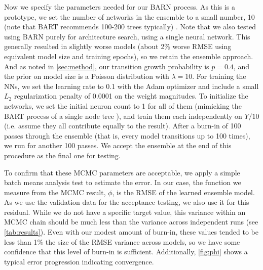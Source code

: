 \documentclass[12pt]{article}
\begin{document}
Now we specify the parameters needed for our BARN process.  As this is a prototype, we set the number of networks in the ensemble to a small number, 10 (note that BART recommends 100-200 trees typically) \cite{chipman2010bart}.  Note that we also tested using BARN purely for architecture search, using a single neural network.  This generally resulted in slightly worse models (about 2\% worse RMSE using equivalent model size and training epochs), so we retain the ensemble approach.  And as noted in \autoref{sec:method}, our transition growth probability is $p=0.4$, and the prior on model size is a Poisson distribution with $\lambda=10$.  For training the NNs, we set the learning rate to 0.1 with the Adam optimizer and include a small $L_2$ regularization penalty of 0.0001 on the weight magnitudes.  To initialize the networks, we set the initial neuron count to 1 for all of them (mimicking the BART process of a single node tree \cite{chipman2010bart}), and train them each independently on $Y/10$ (i.e. assume they all contribute equally to the result).  After a burn-in of 100 passes through the ensemble (that is, every model transitions up to 100 times), we run for another 100 passes.  We accept the ensemble at the end of this procedure as the final one for testing.

To confirm that these MCMC parameters are acceptable, we apply a simple batch means analysis test to estimate the error.  In our case, the function we measure from the MCMC result, $\phi$, is the RMSE of the learned ensemble model.  As we use the validation data for the acceptance testing, we also use it for this residual.  While we do not have a specific target value, this variance within an MCMC chain should be much less than the variance across independent runs (see \autoref{tab:results}).  Even with our modest amount of burn-in, these values tended to be less than 1\% the size of the RMSE variance across models, so we have some confidence that this level of burn-in is sufficient.  Additionally, \autoref{fig:phi} shows a typical error progression indicating convergence.
\end{document}
